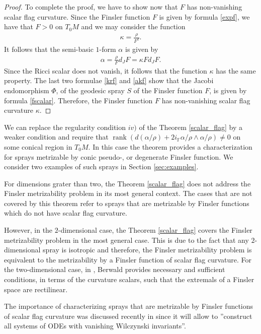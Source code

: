 \documentclass[oneside,english]{amsart}
\numberwithin{equation}{section}
\numberwithin{figure}{section}
\theoremstyle{plain}
\theoremstyle{plain}
\theoremstyle{definition}
\theoremstyle{plain}
\theoremstyle{plain}
\theoremstyle{plain}
\theoremstyle{remark}
\theoremstyle{remark}
\begin{document}
\begin{proof}
  To complete the proof, we have to show now that $F$ has
  non-vanishing scalar flag
  curvature.  Since the Finsler function $F$ is given by formula
  \eqref{expf}, we have that $F>0$ on $T_0M$ and we may consider the
  function
  \begin{eqnarray}
    \kappa=\frac{\rho}{F^2}. \label{krf} \end{eqnarray}
  It follows that the semi-basic $1$-form $\alpha$ is given by 
  \begin{eqnarray}
    \alpha=\frac{\rho}{F}d_JF = \kappa F d_JF. \label{akf}\end{eqnarray}
  Since the Ricci scalar does not vanish, it follows that the function
  $\kappa$ has the same property. The last two formulae \eqref{krf} and \eqref{akf} show that the Jacobi
  endomorphism $\Phi$, of the geodesic spray $S$ of the Finsler function
  $F$, is given by formula \eqref{fscalar}. Therefore, the Finsler
  function $F$ has non-vanishing scalar flag curvature $\kappa$.
\end{proof}

We can replace the regularity condition $iv)$ of the Theorem
\ref{scalar_flag} by a weaker condition and require that
$\operatorname{rank}\left( d(\alpha/\rho) +  2i_{\mathbb F}\alpha/\rho \wedge
    \alpha/\rho \right) \neq 0$ on some conical region in $T_0M$. In
  this case the theorem provides a characterization for sprays
  metrizable by conic pseudo-, or degenerate Finsler function. We
  consider two examples of such sprays in Section \ref{sec:examples}.

For dimensions grater than two, the Theorem \ref{scalar_flag} does not address the Finsler metrizability
problem in its most general context. The cases that are not covered by
this theorem refer to sprays that are metrizable by Finsler functions
which do not have scalar flag curvature. 

However, in the $2$-dimensional case, the Theorem \ref{scalar_flag}
covers the Finsler metrizability problem in the most general case. This is
due to the fact that any $2$-dimensional spray is isotropic and
therefore, the Finsler metrizability problem is equivalent to
the metrizability by a Finsler function of scalar flag curvature. For the two-dimensional case, in \cite{Berwald41}, Berwald provides
necessary and sufficient conditions, in terms of the curvature scalars, such that the extremals of a
Finsler space are rectilinear.

The importance of characterizing sprays that are metrizable by Finsler
functions of scalar flag curvature was discussed recently in
\cite{CDT12} since it will allow to ''construct all systems of ODEs with vanishing Wilczynski invariants''.
\end{document}
